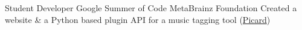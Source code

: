    {Student Developer}
    {Google Summer of Code}
    {MetaBrainz Foundation}
    {}
    {
        Created a website \& a Python based plugin API for a music tagging tool
        (\href{https://github.com/metabrainz/picard-website/commits?author=dufferzafar}{Picard})
    }
    \vspace*{0.2\baselineskip}
